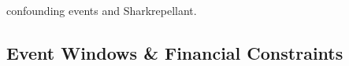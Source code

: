 \documentclass[12pt]{article}
\begin{document}
\citet{mcwilliams1999} confounding events and Sharkrepellant. 
\subsection{Event Windows \& Financial Constraints}
\end{document}
